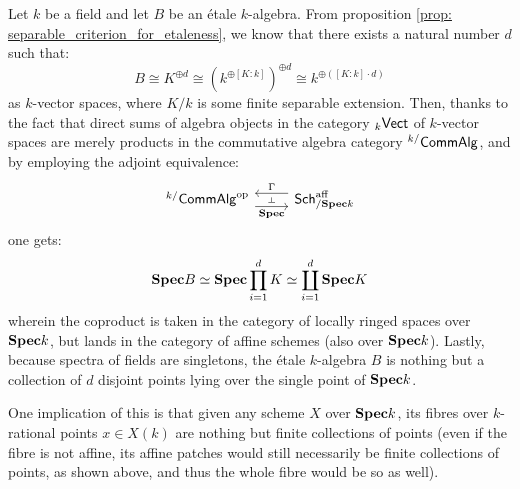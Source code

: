            \begin{remark} \label{remark: fibres_of_etale_maps_over_points}
                Let $k$ be a field and let $B$ be an \'etale $k$-algebra. From proposition \ref{prop: separable_criterion_for_etaleness}, we know that there exists a natural number $d$ such that:
                    $$B \cong K^{\oplus d} \cong (k^{\oplus [K : k]})^{\oplus d} \cong k^{\oplus ([K : k] \cdot d)}$$
                as $k$-vector spaces, where $K/k$ is some finite separable extension. Then, thanks to the fact that direct sums of algebra objects in the category ${}_k\mathsf{Vect}$ of $k$-vector spaces are merely products in the commutative algebra category ${}^{k/}\mathsf{Comm}\mathsf{Alg}$, and by employing the adjoint equivalence:
                    $$
                        \begin{tikzcd}
                        	{{}^{k/}\Comm\Alg^{\op}} & {\Sch^{\aff}_{/\Spec k}}
                        	\arrow[""{name=0, anchor=center, inner sep=0}, "\Spec"', shift right=2, from=1-1, to=1-2]
                        	\arrow[""{name=1, anchor=center, inner sep=0}, "\Gamma"', shift right=2, from=1-2, to=1-1]
                        	\arrow["\dashv"{anchor=center, rotate=-90}, draw=none, from=1, to=0]
                        \end{tikzcd}
                    $$
                one gets:
                    $$\mathbf{Spec} B \simeq \mathbf{Spec} \prod_{i = 1}^d K \simeq \coprod_{i = 1}^d \mathbf{Spec} K$$
                wherein the coproduct is taken in the category of locally ringed spaces over $\mathbf{Spec} k$, but lands in the category of affine schemes (also over $\mathbf{Spec} k$). Lastly, because spectra of fields are singletons, the \'etale $k$-algebra $B$ is nothing but a collection of $d$ disjoint points lying over the single point of $\mathbf{Spec} k$. 
                
                One implication of this is that given any scheme $X$ over $\mathbf{Spec} k$, its fibres over $k$-rational points $x \in X(k)$ are nothing but finite collections of points (even if the fibre is not affine, its affine patches would still necessarily be finite collections of points, as shown above, and thus the whole fibre would be so as well).
            \end{remark}
            
